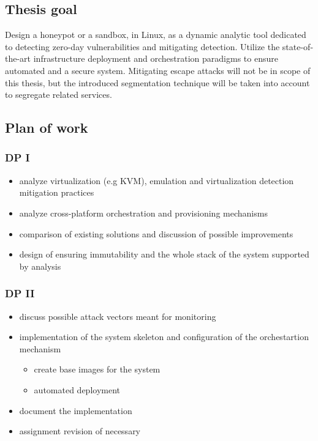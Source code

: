 \documentclass[12pt,a4paper,twoside]{report}
\begin{document}
\subsection{Thesis goal}\label{thesis-goal}

Design a honeypot or a sandbox, in Linux, as a dynamic analytic tool dedicated to detecting zero-day vulnerabilities and mitigating detection. Utilize the state-of-the-art infrastructure deployment and orchestration paradigms to ensure automated and a secure system. Mitigating escape attacks will not be in scope of this thesis, but the introduced segmentation technique will be taken into account to segregate related services.

\subsection{Plan of work}\label{plan-of-work}

\subsubsection{DP I}\label{dp-i}

\begin{itemize}
\item
  analyze virtualization (e.g KVM), emulation and virtualization
  detection mitigation practices
\item
  analyze cross-platform orchestration and provisioning mechanisms
\item
  comparison of existing solutions and discussion of possible
  improvements
\item
  design of ensuring immutability and the whole stack of the system
  supported by analysis
\end{itemize}

\subsubsection{DP II}\label{dp-ii}

\begin{itemize}
\item
  discuss possible attack vectors meant for monitoring
\item
  implementation of the system skeleton and configuration of the
  orchestartion mechanism

  \begin{itemize}
  \item
    create base images for the system
  \item
    automated deployment
  \end{itemize}
\item
  document the implementation
\item
  assignment revision of necessary
\end{itemize}
\end{document}
